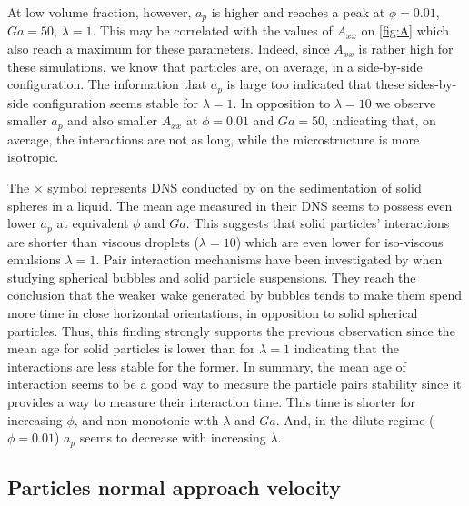 At low volume fraction, however, $a_p$ is higher and reaches a peak at $\phi=0.01$, $Ga=50$, $\lambda=1$.
This may be correlated with the values of $A_{xx}$ on \ref{fig:A} which also reach a maximum for these parameters. 
Indeed, since $A_{xx}$ is rather high for these simulations, we know that particles are, on average, in a side-by-side configuration.
The information that $a_p$ is large too indicated that these sides-by-side configuration seems stable for $\lambda = 1$. 
In opposition to $\lambda = 10$ we observe smaller $a_p$ and also smaller $A_{xx}$ at $\phi = 0.01$ and $Ga = 50$, indicating that, on average, the interactions are not as long, while the microstructure is more isotropic. 

The $\pmb\times$ symbol represents DNS conducted by \citet{zhang2023evolution} on the sedimentation of solid spheres in a liquid. 
The mean age measured in their DNS seems to possess even lower $a_p$ at equivalent $\phi$ and $Ga$. 
This suggests that solid particles' interactions are shorter than viscous droplets ($\lambda = 10$) which are even lower for iso-viscous emulsions $\lambda = 1$. 
Pair interaction mechanisms have been investigated by \citet{yin2008lattice} when studying spherical bubbles and solid particle suspensions.
They reach the conclusion that the weaker wake generated by bubbles tends to make them spend more time in close horizontal orientations, in opposition to solid spherical particles. 
Thus, this finding strongly supports the previous observation since the mean age for solid particles is lower than for $\lambda = 1$ indicating that the interactions are less stable for the former. 
In summary, the mean age of interaction seems to be a good way to measure the particle pairs stability since it provides a way to measure their interaction time. 
This time is shorter for increasing $\phi$, and non-monotonic with $\lambda$ and $Ga$. 
And, in the dilute regime ($\phi = 0.01$) $a_p$ seems to decrease with increasing $\lambda$. 

\subsection{Particles normal approach velocity}

